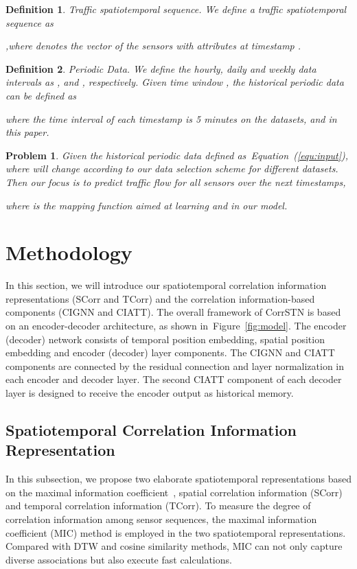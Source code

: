 \documentclass[sn-mathphys,iicol]{sn-jnl}
\newtheorem{defi}{Definition}
\newtheorem{pro}{Problem}
\newcommand\figref[1]{Figure~\ref{#1}}
\newcommand\equref[1]{Equation~(\ref{#1})}
\theoremstyle{thmstyleone}\newtheorem{theorem}{Theorem}\newtheorem{proposition}[theorem]{Proposition}
\theoremstyle{thmstyletwo}\newtheorem{example}{Example}\newtheorem{remark}{Remark}
\theoremstyle{thmstylethree}\newtheorem{definition}{Definition}
\begin{document}
\begin{defi}
Traffic spatiotemporal sequence. 
We define a traffic spatiotemporal sequence as 

,where  denotes the vector of the  sensors with  attributes at timestamp .
\end{defi}

\begin{defi}
 Periodic Data.
We define the hourly, daily and weekly data intervals as ,  and , respectively. Given time window , the historical periodic data can be defined as

where the time interval of each timestamp is 5 minutes on the datasets, and  in this paper. 
\end{defi}

\begin{pro}
Given the historical periodic data  defined as~\equref{equ:input}, where  will change according to our data selection scheme for different datasets. Then our focus is to predict traffic flow for all sensors over the next  timestamps,

where  is the mapping function aimed at learning and  in our model.
\end{pro}

\section{Methodology}
In this section, we will introduce our spatiotemporal correlation information representations (SCorr and TCorr) and the correlation information-based components (CIGNN and CIATT). The overall framework of CorrSTN is based on an encoder-decoder architecture, as shown in~\figref{fig:model}. The encoder (decoder) network consists of temporal position embedding, spatial position embedding and encoder (decoder) layer components. The CIGNN and CIATT components are connected by the residual connection and layer normalization in each encoder and decoder layer. The second CIATT component of each decoder layer is designed to receive the encoder output as historical memory.

\subsection{Spatiotemporal Correlation Information Representation}
In this subsection, we propose two elaborate spatiotemporal representations based on the maximal information coefficient~\cite{Reshef.2011}, spatial correlation information (SCorr) and temporal correlation information (TCorr). To measure the degree of correlation information among sensor sequences, the maximal information coefficient (MIC) method is employed in the two spatiotemporal representations. Compared with DTW and cosine similarity methods, MIC can not only capture diverse associations but also execute fast calculations.
\end{document}
